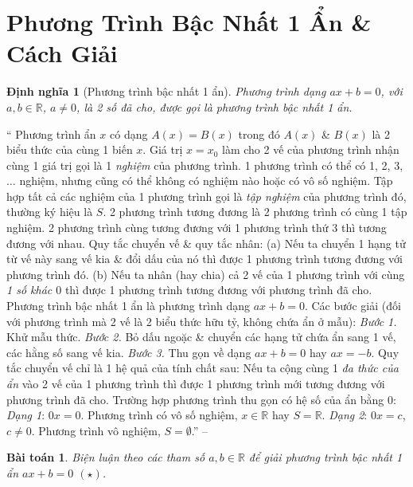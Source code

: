 \documentclass{article}
\numberwithin{equation}{section}
\newtheorem{baitoan}{Bài toán}
\newtheorem{dinhnghia}{Định nghĩa}[section]
\begin{document}
\section{Phương Trình Bậc Nhất 1 Ẩn \& Cách Giải}

\begin{dinhnghia}[Phương trình bậc nhất 1 ẩn]
	Phương trình dạng $ax + b = 0$, với $a,b\in\mathbb{R}$, $a\ne0$, là 2 số đã cho, được gọi là \emph{phương trình bậc nhất 1 ẩn}.
\end{dinhnghia}

`` Phương trình ẩn $x$ có dạng $A(x) = B(x)$ trong đó $A(x)$ \& $B(x)$ là 2 biểu thức của cùng 1 biến $x$. Giá trị $x = x_0$ làm cho 2 vế của phương trình nhận cùng 1 giá trị gọi là 1 \textit{nghiệm} của phương trình. 1 phương trình có thể có 1, 2, 3, $\ldots$ nghiệm, nhưng cũng có thể không có nghiệm nào hoặc có vô số nghiệm. Tập hợp tất cả các nghiệm của 1 phương trình gọi là \textit{tập nghiệm} của phương trình đó, thường ký hiệu là $S$.  2 phương trình tương đương là 2 phương trình có cùng 1 tập nghiệm. 2 phương trình cùng tương đương với 1 phương trình thứ 3 thì tương đương với nhau.  Quy tắc chuyển vế \& quy tắc nhân: (a) Nếu ta chuyển 1 hạng tử từ vế này sang vế kia \& đổi dấu của nó thì được 1 phương trình tương đương với phương trình đó. (b) Nếu ta nhân (hay chia) cả 2 vế của 1 phương trình với cùng \textit{1 số khác $0$} thì được 1 phương trình tương đương với phương trình đã cho.  Phương trình bậc nhất 1 ẩn là phương trình dạng $ax + b = 0$. Các bước giải (đối với phương trình mà 2 vế là 2 biểu thức hữu tỷ, không chứa ẩn ở mẫu): \textit{Bước 1.} Khử mẫu thức. \textit{Bước 2.} Bỏ dấu ngoặc \& chuyển các hạng tử chứa ẩn sang 1 vế, các hằng số sang vế kia. \textit{Bước 3.} Thu gọn về dạng $ax + b = 0$ hay $ax = -b$.  Quy tắc chuyển vế chỉ là 1 hệ quả của tính chất sau: Nếu ta cộng cùng 1 \textit{đa thức của ẩn} vào 2 vế của 1 phương trình thì được 1 phương trình mới tương đương với phương trình đã cho.  Trường hợp phương trình thu gọn có hệ số của ẩn bằng $0$: \textit{Dạng 1}: $0x = 0$. Phương trình có vô số nghiệm, $x\in\mathbb{R}$ hay $S = \mathbb{R}$. \textit{Dạng 2}: $0x = c$, $c\ne 0$. Phương trình vô nghiệm, $S = \emptyset$.'' -- \cite[Chap. III, \S1, pp. 53--54]{Tuyen_Toan_8}

\begin{baitoan}
	Biện luận theo các tham số $a,b\in\mathbb{R}$ để giải phương trình bậc nhất 1 ẩn $ax + b = 0$ $(\star)$.
\end{baitoan}
\end{document}
